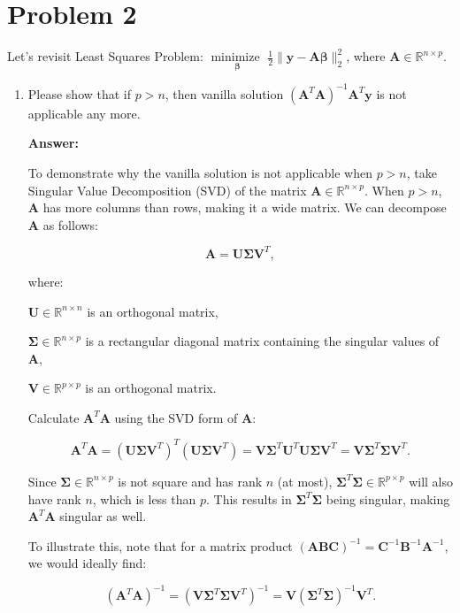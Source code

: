 \documentclass[11pt]{article}
\newcommand{\R}{\mathbb{R}}
\newcommand{\minimize}{\operatorname*{minimize\ }}
\newcommand{\mtx}[1]{\mathbf{#1}}
\newcommand{\vct}[1]{\mathbf{#1}}
\def \mA {\mtx{A}}
\def \vy {\vct{y}}
\def \R {\mathbb{R}}
\begin{document}
	\section*{Problem 2}
	Let's revisit Least Squares Problem: $\minimize \limits_{\bm{\beta}} \frac{1}{2}\|\vy-\mA\bm{\beta}\|^2_2$, where $\mA\in\R^{n\times p}$.
	\begin{enumerate}
		\item Please show that if $p>n$, then vanilla solution $(\mA^T\mA)^{-1}\mA^T\vy$ is not applicable any more.	
		
		\textbf{Answer:}
		
		To demonstrate why the vanilla solution is not applicable when \( p > n \), take Singular Value Decomposition (SVD) of the matrix \(\mathbf{A} \in \mathbb{R}^{n \times p}\). 
		When \( p > n \), \(\mathbf{A}\) has more columns than rows, making it a wide matrix. We can decompose \(\mathbf{A}\) as follows:

		\[
		\mathbf{A} = \mathbf{U} \mathbf{\Sigma} \mathbf{V}^T,
		\]

		where:
		
		\(\mathbf{U} \in \mathbb{R}^{n \times n}\) is an orthogonal matrix,
		
		\(\mathbf{\Sigma} \in \mathbb{R}^{n \times p}\) is a rectangular diagonal matrix containing the singular values of \(\mathbf{A}\),
		
		\(\mathbf{V} \in \mathbb{R}^{p \times p}\) is an orthogonal matrix.

		Calculate \(\mathbf{A}^T \mathbf{A}\) using the SVD form of \(\mathbf{A}\):

		\[
		\mathbf{A}^T \mathbf{A} = (\mathbf{U} \mathbf{\Sigma} \mathbf{V}^T)^T (\mathbf{U} \mathbf{\Sigma} \mathbf{V}^T) = \mathbf{V} \mathbf{\Sigma}^T \mathbf{U}^T \mathbf{U} \mathbf{\Sigma} \mathbf{V}^T = \mathbf{V} \mathbf{\Sigma}^T \mathbf{\Sigma} \mathbf{V}^T.
		\]

		Since \(\mathbf{\Sigma} \in \mathbb{R}^{n \times p}\) is not square and has rank \(n\) (at most), \(\mathbf{\Sigma}^T \mathbf{\Sigma} \in \mathbb{R}^{p \times p}\) will also have rank \(n\), which is less than \(p\). This results in \(\mathbf{\Sigma}^T \mathbf{\Sigma}\) being singular, making \(\mathbf{A}^T \mathbf{A}\) singular as well.

		To illustrate this, note that for a matrix product \((\mathbf{A} \mathbf{B} \mathbf{C})^{-1} = \mathbf{C}^{-1} \mathbf{B}^{-1} \mathbf{A}^{-1}\), we would ideally find:

		\[
		(\mathbf{A}^T \mathbf{A})^{-1} = (\mathbf{V} \mathbf{\Sigma}^T \mathbf{\Sigma} \mathbf{V}^T)^{-1} = \mathbf{V} (\mathbf{\Sigma}^T \mathbf{\Sigma})^{-1} \mathbf{V}^T.
		\]


\end{enumerate}
\end{document}
